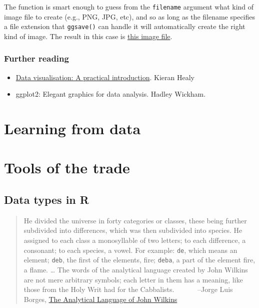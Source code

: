 \documentclass[]{book}
\providecommand{\tightlist}{%
  \setlength{\itemsep}{0pt}\setlength{\parskip}{0pt}}
\begin{document}
The function is smart enough to guess from the \texttt{filename} argument what kind of image file to create (e.g., PNG, JPG, etc), and so as long as the filename specifies a file extension that \texttt{ggsave()} can handle it will automatically create the right kind of image. The result in this case is \href{./output/frame_pic.png}{this image file}.

\hypertarget{further-reading}{%
\section{Further reading}\label{further-reading}}

\begin{itemize}
\tightlist
\item
  \href{https://socviz.co/}{Data visualisation: A practical introduction}. Kieran Healy
\item
  ggplot2: Elegant graphics for data analysis. Hadley Wickham.
\end{itemize}

\hypertarget{part-learning-from-data}{%
\part{Learning from data}\label{part-learning-from-data}}

\hypertarget{part-tools-of-the-trade}{%
\part{Tools of the trade}\label{part-tools-of-the-trade}}

\hypertarget{appendix-appendices}{%
\appendix}


\hypertarget{data-types}{%
\chapter{Data types in R}\label{data-types}}

\begin{quote}
He divided the universe in forty categories or classes, these being further subdivided into differences, which was then subdivided into species. He assigned to each class a monosyllable of two letters; to each difference, a consonant; to each species, a vowel. For example: \texttt{de}, which means an element; \texttt{deb}, the first of the elements, fire; \texttt{deba}, a part of the element fire, a flame. \ldots{} The words of the analytical language created by John Wilkins are not mere arbitrary symbols; each letter in them has a meaning, like those from the Holy Writ had for the Cabbalists.
~~~~~~--Jorge Luis Borges, \href{https://en.wikipedia.org/wiki/The_Analytical_Language_of_John_Wilkins}{The Analytical Language of John Wilkins}
\end{quote}
\end{document}
